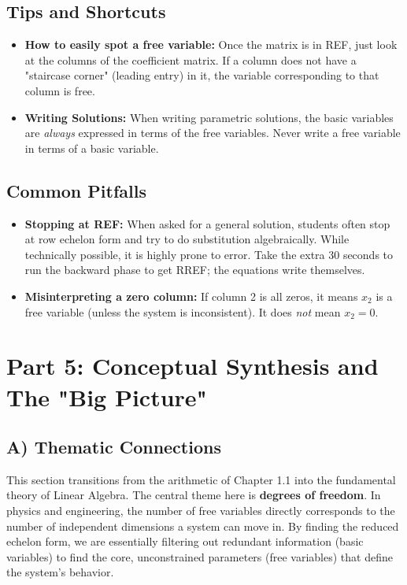 \documentclass[11pt]{article}
\begin{document}
\subsection{Tips and Shortcuts}
\begin{itemize}
    \item \textbf{How to easily spot a free variable:} Once the matrix is in REF, just look at the columns of the coefficient matrix. If a column does not have a "staircase corner" (leading entry) in it, the variable corresponding to that column is free.
    \item \textbf{Writing Solutions:} When writing parametric solutions, the basic variables are \textit{always} expressed in terms of the free variables. Never write a free variable in terms of a basic variable.
\end{itemize}

\subsection{Common Pitfalls}
\begin{itemize}
    \item \textbf{Stopping at REF:} When asked for a general solution, students often stop at row echelon form and try to do substitution algebraically. While technically possible, it is highly prone to error. Take the extra 30 seconds to run the backward phase to get RREF; the equations write themselves.
    \item \textbf{Misinterpreting a zero column:} If column 2 is all zeros, it means $x_2$ is a free variable (unless the system is inconsistent). It does \textit{not} mean $x_2 = 0$.
\end{itemize}

\newpage
\section{Part 5: Conceptual Synthesis and The "Big Picture"}

\subsection{A) Thematic Connections}
This section transitions from the arithmetic of Chapter 1.1 into the fundamental theory of Linear Algebra. The central theme here is \textbf{degrees of freedom}. In physics and engineering, the number of free variables directly corresponds to the number of independent dimensions a system can move in. By finding the reduced echelon form, we are essentially filtering out redundant information (basic variables) to find the core, unconstrained parameters (free variables) that define the system's behavior.
\end{document}

